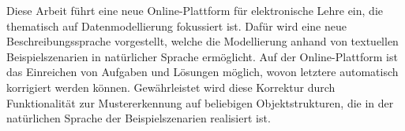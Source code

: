 
Diese Arbeit führt eine neue Online-Plattform für elektronische Lehre ein, die thematisch auf Datenmodellierung fokussiert ist.
Dafür wird eine neue Beschreibungssprache vorgestellt, welche die Modellierung anhand von textuellen Beispielszenarien in natürlicher Sprache ermöglicht.
Auf der Online-Plattform ist das Einreichen von Aufgaben und Lösungen möglich, wovon letztere automatisch korrigiert werden können.
Gewährleistet wird diese Korrektur durch Funktionalität zur Mustererkennung auf beliebigen Objektstrukturen, die in der natürlichen Sprache der Beispielszenarien realisiert ist.
